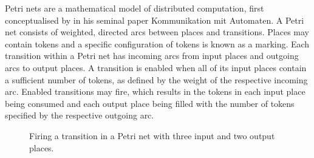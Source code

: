 \documentclass[../../Dissertation.tex]{subfiles}
\begin{document}
Petri nets are a mathematical model of distributed computation, first conceptualised by   in his seminal paper Kommunikation mit Automaten. A Petri net consists of weighted, directed arcs between places and transitions. Places may contain tokens and a specific configuration of tokens is known as a marking. Each transition within a Petri net has incoming arcs from input places and outgoing arcs to output places. A transition is enabled when all of its input places contain a sufficient number of tokens, as defined by the weight of the respective incoming arc. Enabled transitions may fire, which results in the tokens in each input place being consumed and each output place being filled with the number of tokens specified by the respective outgoing arc.
\begin{figure}[H]
  \begin{center}
  \end{center}
  \caption{Firing a transition in a Petri net with three input and two output places.}
  \label{fig:PetriNet}
\end{figure}
\end{document}
